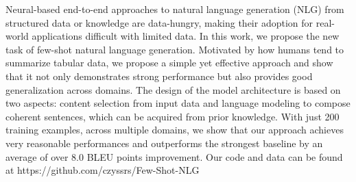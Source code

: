 Neural-based end-to-end approaches to natural language generation (NLG) from structured data or knowledge are data-hungry, making their adoption for real-world applications difficult with limited data. In this work, we propose the new task of few-shot natural language generation. Motivated by how humans tend to summarize tabular data, we propose a simple yet effective approach and show that it not only demonstrates strong performance but also provides good generalization across domains. The design of the model architecture is based on two aspects: content selection from input data and language modeling to compose coherent sentences, which can be acquired from prior knowledge. With just 200 training examples, across multiple domains, we show that our approach achieves very reasonable performances and outperforms the strongest baseline by an average of over 8.0 BLEU points improvement. Our code and data can be found at https://github.com/czyssrs/Few-Shot-NLG

